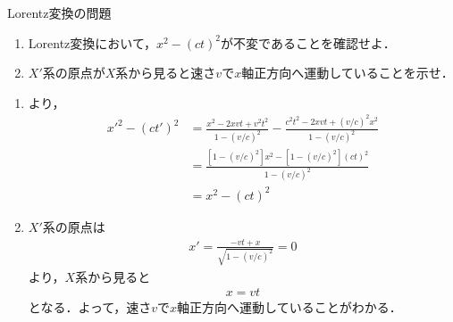 \documentclass{report}
\begin{document}
    \begin{myexc}{Lorentz変換の問題}{}
      \begin{enumerate}
        \item Lorentz変換において，$x^2 - (ct)^2$が不変であることを確認せよ．
        \item $X'$系の原点が$X$系から見ると速さ$v$で$x$軸正方向へ運動していることを示せ．
      \end{enumerate}
      \tcblower
      \begin{enumerate}
        \item {}より，
          \begin{align}
            x'^2 - (ct')^2 &= \frac{x^2 -2xvt + v^2t^2}{1 - (v/c)^2} - \frac{c^2t^2 - 2xvt + (v/c)^2x^2}{1 - (v/c)^2}\\
            &= \frac{[1-(v/c)^2]x^2 - [1 - (v/c)^2](ct)^2}{1 - (v/c)^2}\\
            &= x^2 - (ct)^2
          \end{align}
        \item $X'$系の原点は
          \begin{align}
            x' = \frac{-vt + x}{\sqrt{1-(v/c)^2}} = 0
          \end{align}
          より，$X$系から見ると
          \begin{align}
            x = vt
          \end{align}
          となる．よって，速さ$v$で$x$軸正方向へ運動していることがわかる．
      \end{enumerate}
    \end{myexc}
\end{document}

